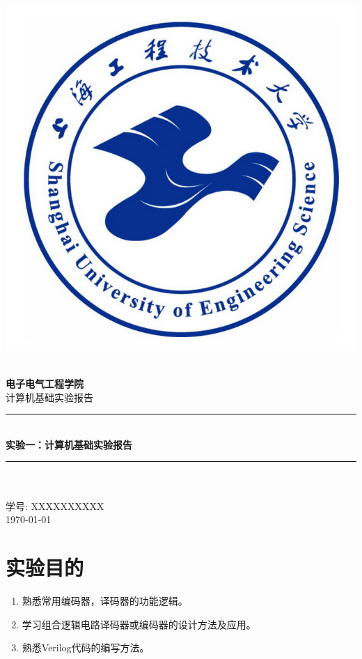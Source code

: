 \documentclass{experiment}
\begin{document}
	\begin{titlepage}
		\newcommand{\HRule}{\rule{\linewidth}{0.5mm}} 							%
		\centering 
		\includegraphics[width=0.4\linewidth]{logo-sues-mark.jpg}
		
		\quad\\[0.5cm]
		
		\textbf{\huge 电子电气工程学院}\\[1cm]
		
		\textsc{\Large 计算机基础实验报告}\\[0.2cm]
		
		\HRule \\[0.8cm]
		
		{\Huge\bfseries 实验一：计算机基础实验报告}\\[0.7cm]
		\HRule \\[2cm]
		\Large
		\\
		学号: XXXXXXXXXX\\[5.5cm]
		\songti													
		{\Large \today}\\[3cm]
	

		\vfill 
	\end{titlepage}
	\setmainfont{Times New Roman}
	\pagestyle{fancy}
	\fancyfoot{}
	\section{实验目的}
	
\begin{enumerate}
\item 熟悉常用编码器，译码器的功能逻辑。
\item 学习组合逻辑电路译码器或编码器的设计方法及应用。
\item 熟悉Verilog代码的编写方法。
\end{enumerate}
	
\end{document}
